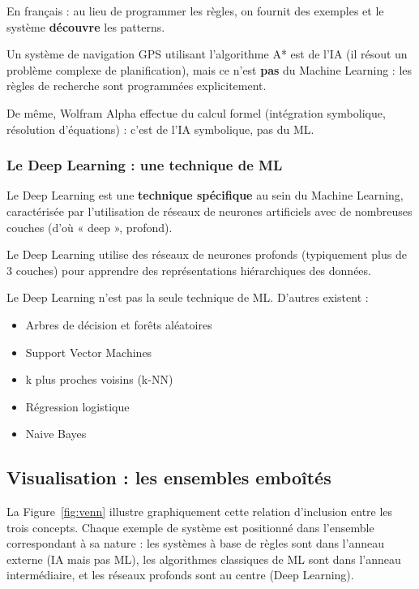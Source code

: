 \documentclass[11pt,a4paper]{article}
\begin{document}
En français : au lieu de programmer les règles, on fournit des exemples et le système \textbf{découvre} les patterns.

\begin{attentionbox}
Un système de navigation GPS utilisant l'algorithme A* est de l'IA (il résout un problème complexe de planification), mais ce n'est \textbf{pas} du Machine Learning : les règles de recherche sont programmées explicitement.

De même, Wolfram Alpha effectue du calcul formel (intégration symbolique, résolution d'équations) : c'est de l'IA symbolique, pas du ML.
\end{attentionbox}

\subsubsection{Le Deep Learning : une technique de ML}

Le Deep Learning est une \textbf{technique spécifique} au sein du Machine Learning, caractérisée par l'utilisation de réseaux de neurones artificiels avec de nombreuses couches (d'où « deep », profond).

\begin{definitionbox}
Le Deep Learning utilise des réseaux de neurones profonds (typiquement plus de 3 couches) pour apprendre des représentations hiérarchiques des données.
\end{definitionbox}

Le Deep Learning n'est pas la seule technique de ML. D'autres existent :
\begin{itemize}
    \item Arbres de décision et forêts aléatoires
    \item Support Vector Machines
    \item k plus proches voisins (k-NN)
    \item Régression logistique
    \item Naive Bayes
\end{itemize}

\subsection{Visualisation : les ensembles emboîtés}

La Figure~\ref{fig:venn} illustre graphiquement cette relation d'inclusion entre les trois concepts. Chaque exemple de système est positionné dans l'ensemble correspondant à sa nature : les systèmes à base de règles sont dans l'anneau externe (IA mais pas ML), les algorithmes classiques de ML sont dans l'anneau intermédiaire, et les réseaux profonds sont au centre (Deep Learning).
\end{document}
